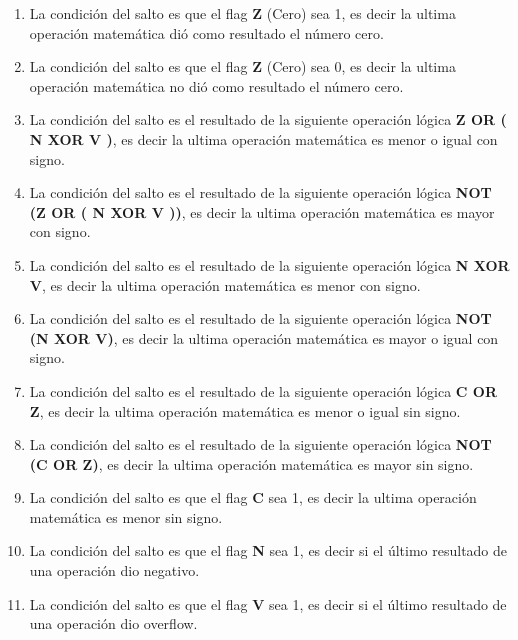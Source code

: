 \begin{enumerate}
\item  {}
La condición del salto es que el flag \textbf{Z} (Cero) sea 1, es decir la ultima operación matemática dió como resultado el número cero.

\item  {}
La condición del salto es que el flag \textbf{Z} (Cero) sea 0, es decir la ultima operación matemática no dió como resultado el número cero.

\item  {}
La condición del salto es el resultado de la siguiente operación lógica \textbf{Z OR ( N XOR V )}, es decir la ultima operación matemática es menor o igual con signo.

\item  {}
La condición del salto es el resultado de la siguiente operación lógica \textbf{NOT (Z OR ( N XOR V ))}, es decir la ultima operación matemática es mayor con signo.

\item  {}
La condición del salto es el resultado de la siguiente operación lógica \textbf{N XOR V}, es decir la ultima operación matemática es menor con signo.

\item  {}
La condición del salto es el resultado de la siguiente operación lógica \textbf{NOT (N XOR V)}, es decir la ultima operación matemática es mayor o igual con signo.

\item  {}
La condición del salto es el resultado de la siguiente operación lógica \textbf{C OR Z}, es decir la ultima operación matemática es menor o igual sin signo.

\item  {}
La condición del salto es el resultado de la siguiente operación lógica \textbf{NOT (C OR Z)}, es decir la ultima operación matemática es mayor sin signo.

\item  {}
La condición del salto es que el flag \textbf{C} sea 1, es decir la ultima operación matemática es menor sin signo.

\item  {}
La condición del salto es que el flag \textbf{N} sea 1, es decir si el último resultado de una operación dio negativo.

\item  {}
La condición del salto es que el flag \textbf{V} sea 1, es decir si el último resultado de una operación dio overflow.

\end{enumerate}